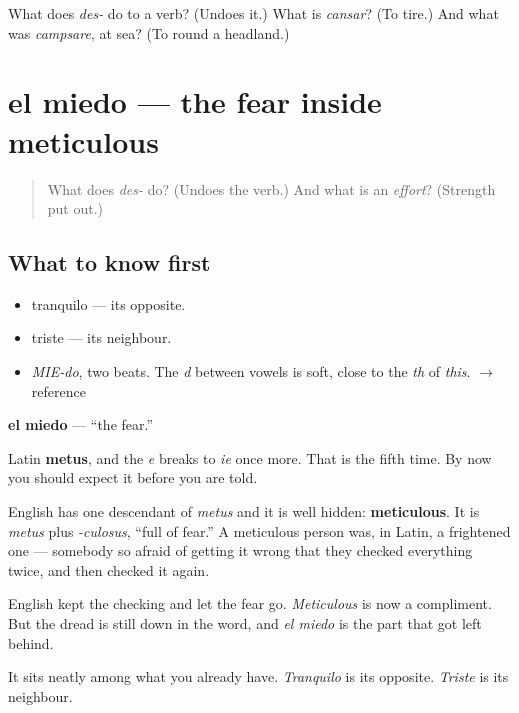 \begin{tcolorbox}[breakable,colback=teal!4,colframe=teal!35!black,title={Before you move on}]
What does \emph{des-} do to a verb? (Undoes it.) What is \emph{cansar}? (To tire.) And what was \emph{campsare}, at sea? (To round a headland.)
\end{tcolorbox}
\section[el miedo]{el miedo — the fear inside meticulous}

\label{lesson:ES-C315-miedo}



\begin{quote}
What does \emph{des-} do? (Undoes the verb.) And what is an \emph{effort}? (Strength put out.)
\end{quote}

\subsection*{What to know first}
\begin{itemize}
\raggedright
  \item tranquilo — its opposite.
  \item triste — its neighbour.
\end{itemize}

\begin{sounds}
\begin{itemize}
\raggedright
  \item \emph{MIE-do}, two beats. The \emph{d} between vowels is soft, close to the \emph{th} of \emph{this}. $\to$ reference
\end{itemize}
\end{sounds}

\begin{cousinweb}
\textbf{el miedo} — \textquotedblleft{}the fear.\textquotedblright{}

Latin \textbf{metus}, and the \emph{e} breaks to \emph{ie} once more. That is the fifth time. By now you should expect it before you are told.

English has one descendant of \emph{metus} and it is well hidden: \textbf{meticulous}. It is \emph{metus} plus \emph{-culosus}, \textquotedblleft{}full of fear.\textquotedblright{} A meticulous person was, in Latin, a frightened one — somebody so afraid of getting it wrong that they checked everything twice, and then checked it again.

English kept the checking and let the fear go. \emph{Meticulous} is now a compliment. But the dread is still down in the word, and \emph{el miedo} is the part that got left behind.

It sits neatly among what you already have. \emph{Tranquilo} is its opposite. \emph{Triste} is its neighbour.
\end{cousinweb}

